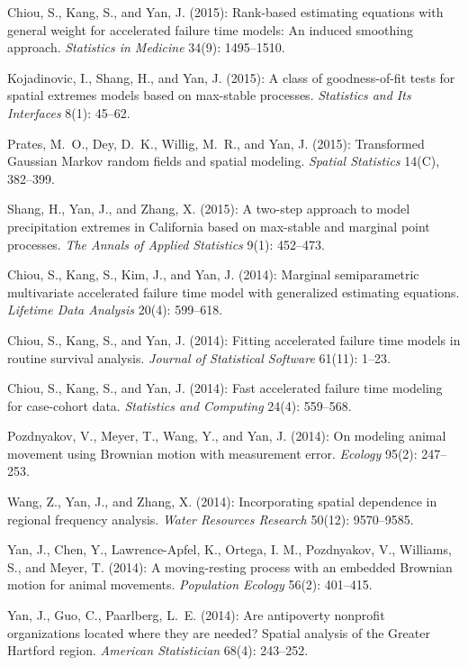 \documentclass[Statistics]{vita}
\begin{document}
\begin{vita}
\begin{Publications}
\begin{RefereedJournalArticles}
  \item *Chiou, S., Kang, S., and Yan, J. (2015): Rank-based estimating equations with general weight for accelerated failure time models: An induced smoothing approach. {\em Statistics in Medicine\/} 34(9): 1495--1510.
  \item Kojadinovic, I., Shang, H., and Yan, J. (2015): A class of goodness-of-fit tests for spatial extremes models based on max-stable processes. {\em Statistics and Its Interfaces\/} 8(1): 45--62.
  \item *Prates, M.~O., Dey, D.~K., Willig, M.~R., and Yan, J. (2015): Transformed Gaussian Markov random fields and spatial modeling. {\em Spatial Statistics\/} 14(C), 382--399.
  \item *Shang, H., Yan, J., and Zhang, X. (2015): A two-step approach to model precipitation extremes in {C}alifornia based on max-stable and marginal point processes. {\em The Annals of Applied Statistics\/} 9(1): 452--473.
  \item *Chiou, S., Kang, S., Kim, J., and Yan, J. (2014): Marginal semiparametric multivariate accelerated failure time model with generalized estimating equations. {\em Lifetime Data Analysis\/} 20(4): 599--618.
  \item *Chiou, S., Kang, S., and Yan, J. (2014): Fitting accelerated failure time models in routine survival analysis. {\em Journal of Statistical Software\/} 61(11): 1--23.
  \item *Chiou, S., Kang, S., and Yan, J. (2014): Fast accelerated failure time modeling for case-cohort data. {\em Statistics and Computing\/} 24(4): 559--568.
  \item Pozdnyakov, V., Meyer, T., Wang, Y., and Yan, J. (2014): On modeling animal movement using Brownian motion with measurement error. {\em Ecology\/} 95(2): 247--253.
  \item *Wang, Z., Yan, J., and Zhang, X. (2014): Incorporating spatial dependence in regional frequency analysis. {\em Water Resources Research\/} 50(12): 9570--9585.
  \item Yan, J., Chen, Y., Lawrence-Apfel, K., Ortega, I. M., Pozdnyakov, V., Williams, S., and Meyer, T. (2014): A moving-resting process with an embedded Brownian motion for animal movements. {\em Population Ecology\/} 56(2): 401--415.
  \item Yan, J., Guo, C., Paarlberg, L.~E. (2014): Are antipoverty nonprofit organizations located where they are needed? Spatial analysis of the Greater Hartford region. {\em American Statistician\/} 68(4): 243--252.

\end{RefereedJournalArticles}
\end{Publications}
\end{vita}
\end{document}
